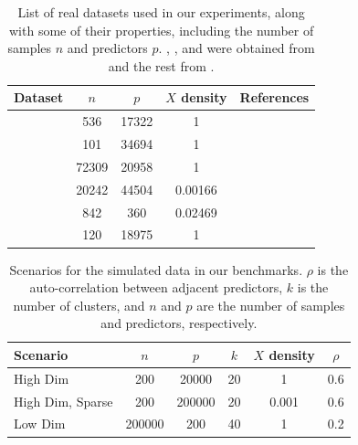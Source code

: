 \documentclass[article]{jss}
\begin{document}
\begin{table}[tp]
  \centering
  \begin{tabular}{
      l
      S[table-format=5.0]
      S[table-format=7.0]
      S[table-format=1.5,round-mode=figures,round-precision=2]
      p{5cm}
    }
    \toprule
    Dataset                    & {\(n\)} & {\(p\)} & {\(X\) density} & {References}                        \\
    \midrule
                & 536     & 17322   & 1               & \citet{nationalcancerinstitute2022} \\
     & 101     & 34694   & 1               & \citet{koussounadis2014}            \\
             & 72309   & 20958   & 1               & \citet{mccallum2010}                \\
                 & 20242   & 44504   & 0.00166         & \citet{lewis2004}                   \\
             & 842     & 360     & 0.02469         & \citet{rhee2006}                    \\
          & 120     & 18975   & 1               & \citet{scheetz2006}                 \\
    \bottomrule
  \end{tabular}
  \caption{%
    List of real datasets used in our experiments, along with some of
    their properties, including the number of samples \(n\) and predictors \(p\).
    , , and  were
    obtained from \citet{breheny2022} and the rest from \citet{chang2016}.
  }
  \label{tab:real-data}
\end{table}

\begin{table}[tp]
  \centering
  \begin{tabular}{
      l
      S[table-format=6.0]
      S[table-format=6.0]
      S[table-format=2.0]
      S[table-format=1.3]
      S[table-format=0.1]
    }
    \toprule
    {Scenario}       & {\(n\)} & {\(p\)} & {\(k\)} & {\(X\) density} & {\(\rho\)} \\
    \midrule
    High Dim         & 200     & 20000   & 20      & 1               & 0.6        \\
    High Dim, Sparse & 200     & 200000  & 20      & 0.001           & 0.6        \\
    Low Dim          & 200000  & 200     & 40      & 1               & 0.2        \\
    \bottomrule
  \end{tabular}
  \caption{
    Scenarios for the simulated data in our benchmarks. \(\rho\) is the auto-correlation
    between adjacent predictors, \(k\) is the number of clusters, and
    \(n\) and \(p\) are the number of samples and predictors, respectively.
  }
  \label{tab:simulated-data}
\end{table}
\end{document}
